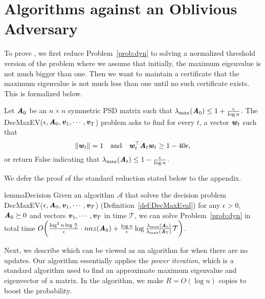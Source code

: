 

\section{Algorithms against an Oblivious Adversary}\label{sec:Obl}

To prove , we first reduce Problem~\ref{prob:dyn} to solving a normalized threshold version of the problem where we assume that initially, the maximum eigenvalue is not much bigger than one. Then we want to maintain a certificate that 
the maximum eigenvalue is not much less than one until no such certificate exists. This is formalized below.
%
%
\begin{problem}\label{def:DecMaxEval} Let $\AA_0$ be an $n\times n$ symmetric PSD matrix such that $ \lambda_{\max}(\AA_0) \leq 1 + \frac{\epsilon}{\log n}$. The {\sc DecMaxEV}($\epsilon,\AA_0,\vv_1,\cdots,\vv_T$) problem asks to find for every $t$, a vector $\ww_t$ such that 
\[
\|\ww_t\| = 1 \quad \text{and} \quad \ww_t^{\top}\AA_t \ww_t \geq 1-40\epsilon,
\]
or return {\sc False} indicating that $\lambda_{\max}(\AA_t)\le 1- \frac{\eps}{\log n}$.
\end{problem} 
We defer the proof of the standard reduction stated below to the appendix.
%
\begin{restatable}{lemma}{Decision}\label{lem:Decision}
Given an algorithm $\mathcal{A}$ that solves the decision problem {\sc DecMaxEV}($\epsilon,\AA_0,\vv_1,\cdots,\vv_T$) (Definition~\ref{def:DecMaxEval}) for any $\epsilon>0$, $\AA_0 \succeq 0$ and vectors $\vv_1,\cdots,\vv_T$ in time $\mathcal{T}$, we can solve Problem~\ref{prob:dyn} in total time $O\left(\frac{\log^2 n\log\frac{n}{\epsilon}}{\epsilon}\cdot nnz(\AA_0) + \frac{\log n}{\epsilon}\log \frac{\lambda_{\max}(\AA_0)}{\lambda_{\max}(\AA_T)}\mathcal{T}\right)$.
\end{restatable}
%
%
Next, we describe  which can be viewed as an algorithm for  when there are no updates. 
Our algorithm essentially applies the {\it power iteration}, which is a standard algorithm used to find an approximate maximum eigenvalue and eigenvector of a matrix. In the algorithm, we make $R = O(\log n)$ copies to boost the probability.
%
%
